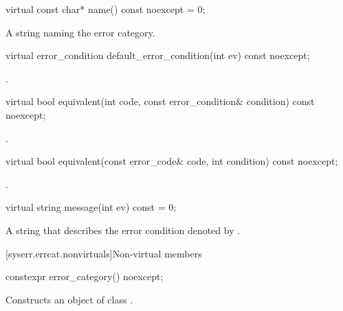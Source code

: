 %
\begin{itemdecl}
virtual const char* name() const noexcept = 0;
\end{itemdecl}

\begin{itemdescr}
\pnum
\returns A string naming the error category.
\end{itemdescr}

%
\begin{itemdecl}
virtual error_condition default_error_condition(int ev) const noexcept;
\end{itemdecl}

\begin{itemdescr}
\pnum
\returns
{}.
\end{itemdescr}

%
\begin{itemdecl}
virtual bool equivalent(int code, const error_condition& condition) const noexcept;
\end{itemdecl}

\begin{itemdescr}
\pnum
\returns {}.
\end{itemdescr}

%
\begin{itemdecl}
virtual bool equivalent(const error_code& code, int condition) const noexcept;
\end{itemdecl}

\begin{itemdescr}
\pnum
\returns {}.
\end{itemdescr}

%
\begin{itemdecl}
virtual string message(int ev) const = 0;
\end{itemdecl}

\begin{itemdescr}
\pnum
\returns A string that describes the error condition denoted by .
\end{itemdescr}

[syserr.errcat.nonvirtuals]{Non-virtual members}

\begin{removedblock}
%
\begin{itemdecl}
constexpr error_category() noexcept;
\end{itemdecl}

\begin{itemdescr}
\pnum
\effects Constructs an object of class .
\end{itemdescr}
\end{removedblock}

